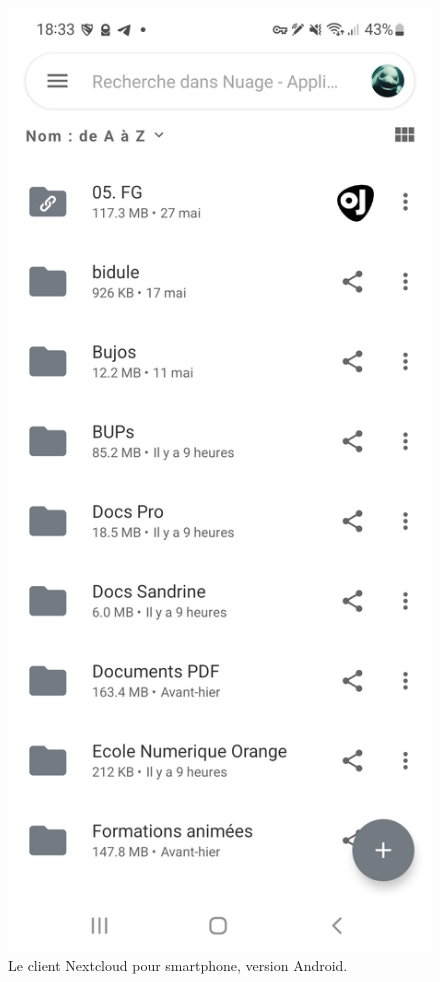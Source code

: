 \begin{multicols}{2}
\begin{figure}
	\centering
	\includegraphics{./Captures/nextcloud-client.smartphone.jpg}
	\caption{Le client Nextcloud pour smartphone, version Android.}
\end{figure}
\end{multicols}

